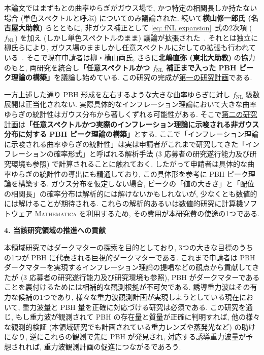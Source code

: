 \documentclass[11pt,a4paper,uplatex,dvipdfmx]{ujarticle} 		%
\newcommand{\研究課題名}{曲率ゆらぎの統計と原始ブラックホール量の精密対応}
\newcommand{\研究機関名}{名古屋大学}
\newcommand{\研究代表者氏名}{多田祐一郎}
\newcommand{\研究期間の最終元号年度}{4}  %
\renewcommand{\emph}[1]{{\sffamily\gtfamily\bfseries #1}}
\newcommand{\fNL}{f_\mathrm{NL}}
\begin{document}
本論文ではまずもとの曲率ゆらぎがガウス場で, かつ特定の相関長しか持たない場合 (単色スペクトルと呼ぶ) についてのみ議論された.
続いて\emph{横山修一郎氏 (名古屋大助教)} らとともに, 非ガウス補正として \eqref{eq: fNL expansion}~式の2次項 ($\fNL$) を加え (しかし単色スペクトルのまま) 議論が拡張された~\cite{Yoo:2019pma}.
それとは独立に柳氏らにより, ガウス場のまましかし任意スペクトルに対しての拡張も行われている~\cite{Yoo:2020dkz}.
そこで現在申請者は柳・横山両氏, さらに\emph{北嶋直弥 (東北大助教)} の協力のもと, 両研究を統合し\emph{\boldmath「任意スペクトルかつ $\fNL$ 補正まで入った PBH ピーク理論の構築」}を議論し始めている.
この研究の完成が\ul{第一の研究計画}である.

一方上述した通り PBH 形成を左右するような大きな曲率ゆらぎに対し $\fNL$ 級数展開は正当化されない.
実際具体的なインフレーション理論において大きな曲率ゆらぎの統計性はガウス分布から著しくずれる可能性がある.
そこで\ul{第二の研究計画}は\emph{「任意スペクトルかつ実際のインフレーション理論に示唆される非ガウス分布に対する PBH ピーク理論の構築」}とする.
ここで「インフレーション理論に示唆される曲率ゆらぎの統計性」は実は申請者がこれまで研究してきた「インフレーションの確率形式」と呼ばれる解析手法 (3 応募者の研究遂行能力及び研究環境も参照) で計算されることに触れておく.
したがって申請者は具体的な曲率ゆらぎの統計性の導出にも精通しており, この具体形を参考に PBH ピーク理論を構築する.
ガウス分布を仮定しない場合, ピークの「値の大きさ」と「配位の相関長」の確率分布は解析的には解けないかもしれないが,
少なくとも数値的には解けることが期待される.
これらの解析的あるいは数値的研究に計算機ソフトウェア \textsc{Mathematica} を利用するため,
その費用が本研究費の使途の1つである.




\begin{mdframed}[roundcorner=0.5zw,
	innertopmargin=0.8zw,innerbottommargin=0.8zw,
	linecolor=black!50,linewidth=0.2zw,
	backgroundcolor=black!10]
	{\bfseries\gtfamily\sffamily\large 4. 当該研究領域の推進への貢献}
\end{mdframed}

\noindent
本領域研究ではダークマターの探索を目的としており, 3つの大きな目標のうちの1つが PBH に代表される巨視的ダークマターである.
これまで申請者は PBH ダークマターを実現するインフレーション理論の提唱などの観点から貢献してきたが (3 応募者の研究遂行能力及び研究環境も参照),
PBH がダークマターであることを裏付けるためには相補的な観測根拠が不可欠である.
誘導重力波はその有力な候補の1つであり, 様々な重力波観測計画が実現しようとしている現在において,
重力波量と PBH 量を正確に対応づける研究は必須である.
この研究を通じ, もし重力波が観測されて PBH の存在量と質量が正確に判明すれば, 
他の様々な観測的検証 (本領域研究でも計画されている重力レンズや蒸発光など) の助けになり,
逆にこれらの観測で先に PBH が発見され, 対応する誘導重力波量が予想されれば, 重力波観測計画の促進につながるであろう.
\end{document}
